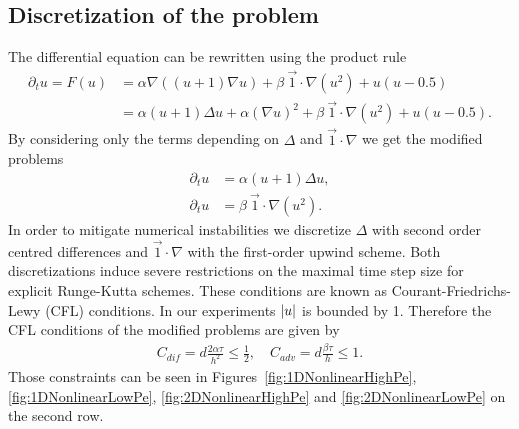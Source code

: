 \documentclass{scrartcl}
\begin{document}
\subsection{Discretization of the problem}
	The differential equation can be rewritten using the product rule
	\begin{align*}
		\partial_{t}u = F(u) 
			&= \alpha\nabla((u+1)\nabla u) 
				+ \beta\ \vec{1}\!\cdot\!\nabla (u^2)
				+ u(u-0.5) \\
			&= \alpha(u+1)\Delta u + \alpha(\nabla u)^2 
				+ \beta\ \vec{1}\!\cdot\!\nabla (u^2) + u(u-0.5). 				
	\end{align*}
	By considering only the terms depending on $\Delta $ and $\vec{1}\!\cdot\!\nabla $ we get the modified problems
	\begin{align*}
		\partial_{t}u &= \alpha(u+1)\Delta u,
		 \\
		\partial_{t}u &= \beta~\vec{1}\!\cdot\!\nabla (u^2) .
	\end{align*}
	In order to mitigate numerical instabilities we discretize $\Delta$ with second order centred differences and $\vec{1}\!\cdot\!\nabla$ with the first-order upwind scheme. Both discretizations induce severe restrictions on the maximal time step size for explicit Runge-Kutta schemes. These conditions are known as Courant-Friedrichs-Lewy (CFL) conditions. In our experiments $\lvert u\rvert$ is bounded by 1. Therefore the CFL conditions of the modified problems are given by
	\begin{align} \label{eq:CFL}
		C_{dif} = d\frac{2\alpha\tau}{h^2} \le \frac{1}{2}, \quad C_{adv} = d\frac{\beta\tau}{h} \le 1.
	\end{align}
	Those constraints can be seen in Figures~\ref{fig:1DNonlinearHighPe}, \ref{fig:1DNonlinearLowPe}, \ref{fig:2DNonlinearHighPe} and \ref{fig:2DNonlinearLowPe} on the second row. 
	
\end{document}
